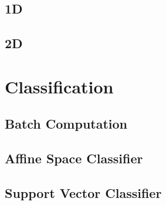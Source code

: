 \documentclass[twocolumn]{article}
\begin{document}
\subsection{1D}

\subsection{2D}

\section{Classification}

\subsection{Batch Computation}

\subsection{Affine Space Classifier}

\subsection{Support Vector Classifier}
\end{document}
